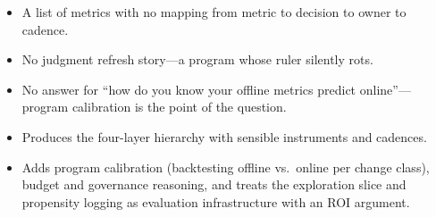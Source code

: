 \begin{interviewq}
\redflags
\begin{itemize}
    \item A list of metrics with no mapping from metric to decision to owner to cadence.
    \item No judgment refresh story---a program whose ruler silently rots.
    \item No answer for ``how do you know your offline metrics predict online''---program calibration is the point of the question.
\end{itemize}


\goodgreat
\begin{itemize}
    \item {} Produces the four-layer hierarchy with sensible instruments and cadences.
    \item {} Adds program calibration (backtesting offline vs.\ online per change class), budget and governance reasoning, and treats the exploration slice and propensity logging as evaluation infrastructure with an ROI argument.
\end{itemize}

\end{interviewq}
